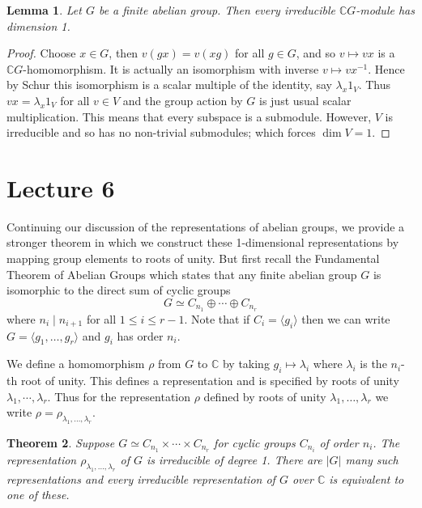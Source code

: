 \documentclass[11pt, notitlepage]{article}
\numberwithin{equation}{section}
\theoremstyle{plain}
\newtheorem{theorem}{Theorem}[section]
\newtheorem{lemma}[theorem]{Lemma}
\theoremstyle{definition}
\newcommand{\C}{\mathbb{C}}
\begin{document}
\begin{lemma}
Let $G$ be a finite abelian group. Then every irreducible $\C G$-module has dimension 1.
\end{lemma}

\begin{proof}
Choose $x \in G$, then $v(gx) = v(xg)$ for all $g \in G$, and so $v \mapsto vx$ is a $\C G$-homomorphism. It is actually an isomorphism with inverse $v \mapsto vx^{-1}$. Hence by Schur this isomorphism is a scalar multiple of the identity, say $\lambda_x1_V$. Thus $vx = \lambda_x1_V$ for all $v \in V$ and the group action by $G$ is just usual scalar multiplication. This means that every subspace is a submodule. However, $V$ is irreducible and so has no non-trivial submodules; which forces $\dim V = 1$.
\end{proof}











\section{Lecture 6}


Continuing our discussion of the representations of abelian groups, we provide a stronger theorem in which we construct these 1-dimensional representations by mapping group elements to roots of unity. But first recall the Fundamental Theorem of Abelian Groups which states that any finite abelian group $G$ is isomorphic to the direct sum of cyclic groups
\[
	G \simeq C_{n_1} \oplus \cdots \oplus C_{n_r}
\]
where $n_i \mid n_{i+1}$ for all $1 \leq i \leq r-1$. Note that if $C_i = \langle g_i \rangle$ then we can write $G = \langle g_1,\ldots, g_r \rangle$ and $g_i$ has order $n_i$.

We define a homomorphism $\rho$ from $G$ to $\mathbb{C}$ by taking $g_i \mapsto \lambda_i$ where $\lambda_i$ is the $n_i$-th root of unity. This defines a representation and is specified by roots of unity $\lambda_1,\cdots, \lambda_r$. Thus for the representation $\rho$ defined by roots of unity $\lambda_1,\ldots, \lambda_r$ we write $\rho = \rho_{\lambda_1,\ldots,\lambda_r}$.

\begin{theorem}
Suppose $G\simeq C_{n_1}\times\cdots\times C_{n_r}$ for cyclic groups $C_{n_i}$ of order $n_i$. The representation $\rho_{\lambda_1,\ldots,\lambda_r}$ of $G$ is irreducible of degree 1. There are $|G|$ many such representations and every irreducible representation of $G$ over $\mathbb{C}$ is equivalent to one of these.
\end{theorem}
\end{document}
